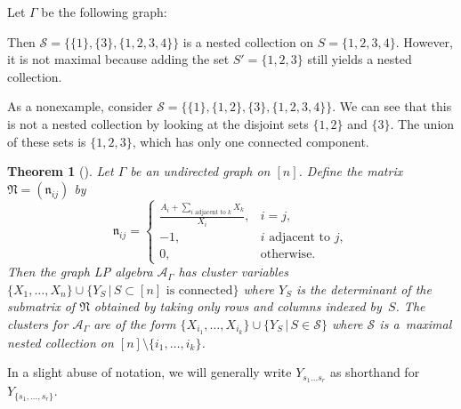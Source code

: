 \documentclass[pdftex]{sigma}
\numberwithin{equation}{section}
\newtheorem{Theorem}{Theorem}[section]
\newcommand{\new}[1]{{#1}}
\newcommand{\calS}{\mathcal{S}}
\begin{document}
\begin{Example}\label{ex:nested-coll}
Let $\Gamma$ be the following graph:
\begin{center}
\end{center}

Then $\calS=\{\{1\},\{3\},\{1,2,3,4\}\}$ is a nested collection on $S=\{1,2,3,4\}$. However, it is not maximal because adding the set $S'=\{1,2,3\}$ still yields a nested collection.

As a nonexample, consider $\calS=\{\{1\},\{1,2\},\{3\},\{1,2,3,4\}\}$. We can see that this is not a nested collection by looking at the disjoint sets $\{1,2\}$ and $\{3\}$. The union of these sets is $\{1,2,3\}$, which has only one connected component.
\end{Example}

\begin{Theorem}[{\cite[Theorem 1.1]{LP-16}}]\label{thm:graph-LP-defn}
Let $\Gamma$ be an undirected graph on $[n]$. Define the matrix $\mathfrak{N}=(\mathfrak{n}_{ij})$ by \[\mathfrak{n}_{ij}=\begin{cases}
{\displaystyle \new{\frac{ A_i+\sum_{i\text{ adjacent to }k}X_k}{X_i}}}, & i=j, \\
-1, & i\text{ adjacent to }j, \\
0, & \text{otherwise}.
\end{cases}\]
Then the graph LP algebra $\mathcal{A}_\Gamma$ has cluster variables $\{X_1,\dots,X_n\} \cup \{Y_S\, |\, S\subset[n]\text{ is connected}\}$ where $Y_S$ is the determinant of the submatrix of $\mathfrak{N}$ obtained by taking only rows and columns indexed by~$S$. The clusters for $\new{\mathcal{A}_\Gamma}$ are of the form $\{X_{i_1},\dots,X_{i_k}\}\cup\{Y_S\, |\, S\in \calS\}$ where $\calS$ is a~maximal nested collection on $[n]\setminus\{i_1,\dots,i_k\}$.
\end{Theorem}

In a slight abuse of notation, we will generally write $Y_{s_1\dots s_r}$ as shorthand for $Y_{\{s_1,\dots,s_r\}}$.
\end{document}
